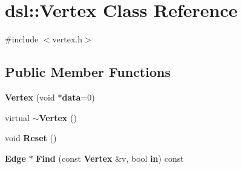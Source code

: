 \section{dsl\-:\-:\-Vertex \-Class \-Reference}
\label{classdsl_1_1Vertex}


{\ttfamily \#include $<$vertex.\-h$>$}

\subsection*{\-Public \-Member \-Functions}
\begin{DoxyCompactItemize}
\item 
{\bf \-Vertex} (void $\ast${\bf data}=0)
\item 
virtual {\bf $\sim$\-Vertex} ()
\item 
void {\bf \-Reset} ()
\item 
{\bf \-Edge} $\ast$ {\bf \-Find} (const {\bf \-Vertex} \&v, bool {\bf in}) const 
\end{DoxyCompactItemize}
